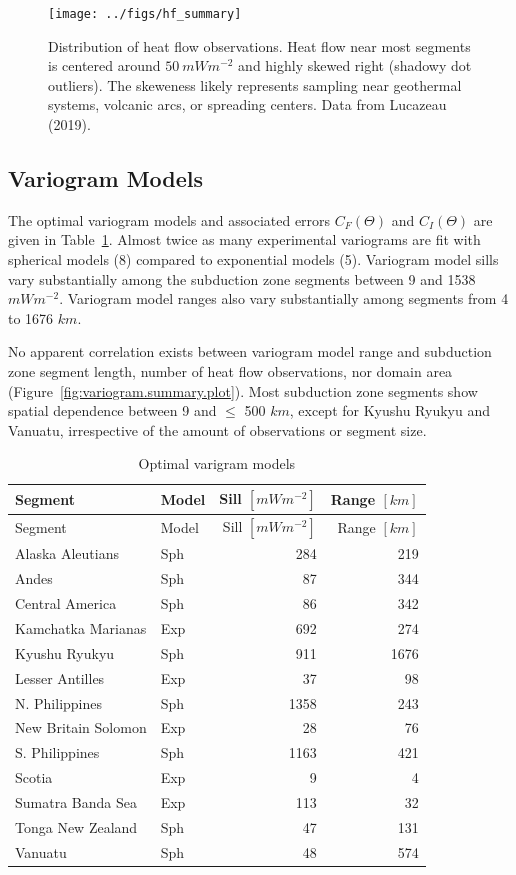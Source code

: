 \documentclass[draft,linenumbers]{agujournal2018}
\begin{document}
\begin{figure}[h]

{\centering \texttt{[image: ../figs/hf\_summary]} 

}

\caption{Distribution of heat flow observations. Heat flow near most segments is centered around $50~mWm^{-2}$ and highly skewed right (shadowy dot outliers). The skeweness likely represents sampling near geothermal systems, volcanic arcs, or spreading centers. Data from Lucazeau (2019).}\label{fig:hf.summary.plot}
\end{figure}

\clearpage

\subsection{Variogram Models}

The optimal variogram models and associated errors \(C_F(\Theta)\) and
\(C_I(\Theta)\) are given in Table~\ref{tbl:variogram.summary.table}.
Almost twice as many experimental variograms are fit with spherical
models (8) compared to exponential models (5). Variogram model sills
vary substantially among the subduction zone segments between 9 and 1538
\(mWm^{-2}\). Variogram model ranges also vary substantially among
segments from 4 to 1676 \(km\).

No apparent correlation exists between variogram model range and
subduction zone segment length, number of heat flow observations, nor
domain area (Figure~\ref{fig:variogram.summary.plot}). Most subduction
zone segments show spatial dependence between 9 and \(\leq\) 500 \(km\),
except for Kyushu Ryukyu and Vanuatu, irrespective of the amount of
observations or segment size.

\hypertarget{tbl:variogram.summary.table}{}
\begin{longtable}[]{@{}llrr@{}}
\caption{\label{tbl:variogram.summary.table}Optimal varigram
models}\tabularnewline
\toprule
Segment & Model & Sill \([mWm^{-2}]\) & Range \([km]\) \\
\midrule
\endfirsthead
\toprule
Segment & Model & Sill \([mWm^{-2}]\) & Range \([km]\) \\
\midrule
\endhead
Alaska Aleutians & Sph & 284 & 219 \\
Andes & Sph & 87 & 344 \\
Central America & Sph & 86 & 342 \\
Kamchatka Marianas & Exp & 692 & 274 \\
Kyushu Ryukyu & Sph & 911 & 1676 \\
Lesser Antilles & Exp & 37 & 98 \\
N. Philippines & Sph & 1358 & 243 \\
New Britain Solomon & Exp & 28 & 76 \\
S. Philippines & Sph & 1163 & 421 \\
Scotia & Exp & 9 & 4 \\
Sumatra Banda Sea & Exp & 113 & 32 \\
Tonga New Zealand & Sph & 47 & 131 \\
Vanuatu & Sph & 48 & 574 \\
\bottomrule
\end{longtable}
\end{document}
